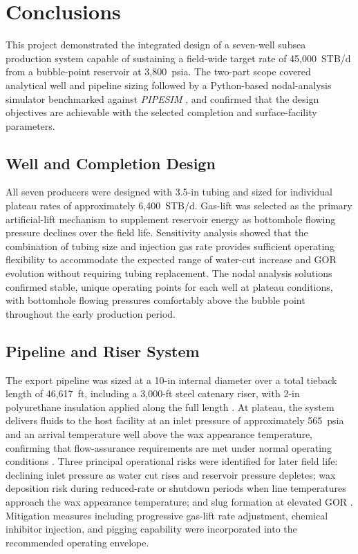 
\chapter{Conclusions}

This project demonstrated the integrated design of a seven-well subsea production
system capable of sustaining a field-wide target rate of 45,000~STB/d from a
bubble-point reservoir at 3,800~psia.
The two-part scope covered analytical well and pipeline sizing followed by a
Python-based nodal-analysis simulator benchmarked against \emph{PIPESIM}
\cite{Schlumberger2023}, and confirmed that the design objectives are achievable
with the selected completion and surface-facility parameters.

\section{Well and Completion Design}

All seven producers were designed with 3.5-in tubing and sized for individual
plateau rates of approximately 6,400~STB/d.
Gas-lift was selected as the primary artificial-lift mechanism to supplement
reservoir energy as bottomhole flowing pressure declines over the field life.
Sensitivity analysis showed that the combination of tubing size and injection
gas rate provides sufficient operating flexibility to accommodate the expected
range of water-cut increase and GOR evolution without requiring tubing
replacement.
The nodal analysis solutions confirmed stable, unique operating points for each
well at plateau conditions, with bottomhole flowing pressures
comfortably above the bubble point throughout the early production period.

\section{Pipeline and Riser System}

The export pipeline was sized at a 10-in internal diameter over a total tieback
length of 46,617~ft, including a 3,000-ft steel catenary riser, with 2-in
polyurethane insulation applied along the full length \cite{Bai2005}.
At plateau, the system delivers fluids to the host facility at an inlet pressure
of approximately 565~psia and an arrival temperature well above the wax
appearance temperature, confirming that flow-assurance requirements are met
under normal operating conditions \cite{Bai2005}.
Three principal operational risks were identified for later field life: declining
inlet pressure as water cut rises and reservoir pressure depletes; wax deposition
risk during reduced-rate or shutdown periods when line temperatures approach the
wax appearance temperature; and slug formation at elevated GOR \cite{BeggsBrill1973}.
Mitigation measures including progressive gas-lift rate adjustment, chemical
inhibitor injection, and pigging capability were incorporated into the recommended
operating envelope.

